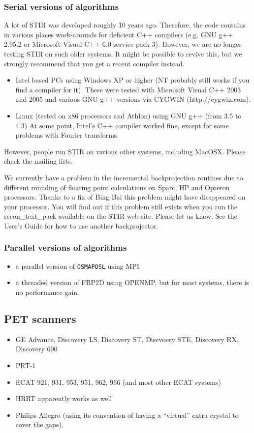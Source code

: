 \documentclass{article}
\begin{document}
\subsubsection{
Serial versions of algorithms}
A lot of STIR was developed roughly 10 years ago. Therefore, the code
contains in various places work-arounds for deficient C++ compilers
(e.g. GNU g++ 2.95.2 or Microsoft Visual C++ 6.0 service pack 3). 
However, we are no longer
testing STIR on such older systems. It might be possible to revive this,
but we strongly recommend that you get a recent compiler instead.
\begin{itemize}
\item 
Intel based PCs using Windows XP or higher (NT probably still works if you
find a compiler for it). These were tested with Microsoft Visual C++ 2003 and 2005
and various GNU g++ versions via CYGWIN (http://cygwin.com).
\item 
Linux (tested on x86 processors and Athlon) using GNU g++ (from 3.5 to 4.3)
At some point, Intel's C++ compiler worked fine, except for some problems with Fourier transforms.
\end{itemize}
However, people run STIR on various other systems, including MacOSX. Please
check the mailing lists.

We currently have a problem 
in the incremental backprojection routines due to different rounding 
of floating point calculations on Sparc, HP and Opteron processors. 
Thanks to a fix of Bing Bai this problem might have disappeared on your processor.
You will find out if this problem still exists when you run the 
recon\_text\_pack available on the STIR web-site. Please let us know.
See the User's Guide for how to use another backprojector.


\subsubsection{
Parallel versions of algorithms}
\begin{itemize}
\item a parallel version of \texttt{OSMAPOSL} using MPI 
\item a threaded version of FBP2D using OPENMP, but for most systems, there is no performance gain.
\end{itemize}




\subsection{
PET scanners}
\begin{itemize}
\item 
GE Advance, Discovery LS, Discovery ST, Discvoery STE, Discovery RX,
Discovery 600 
\item 
PRT-1 
\item 
ECAT 921, 931, 953, 951, 962, 966 (and most other ECAT systems) 
\item 
HRRT apparently works as well
\item Philips Allegro (using its convention of having a ``virtual'' extra crystal to cover the gaps).
\end{itemize}
\end{document}
